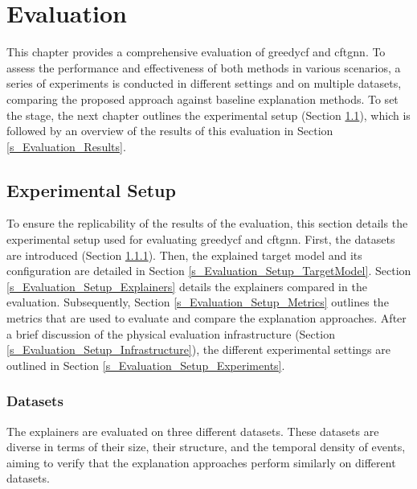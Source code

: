 \section{Evaluation}
\label{s_Evaluation}

This chapter provides a comprehensive evaluation of \gls{greedycf} and \gls{cftgnn}. To assess the performance and effectiveness of both methods in various scenarios, a series of experiments is conducted in different settings and on multiple datasets, comparing the proposed approach against baseline explanation methods. To set the stage, the next chapter outlines the experimental setup (Section \ref{s_Evaluation_Setup}), which is followed by an overview of the results of this evaluation in Section \ref{s_Evaluation_Results}.

\subsection{Experimental Setup}
\label{s_Evaluation_Setup}

To ensure the replicability of the results of the evaluation, this section details the experimental setup used for evaluating \gls{greedycf} and \gls{cftgnn}. First, the datasets are introduced (Section \ref{s_Evaluation_Setup_Datasets}). Then, the explained target model and its configuration are detailed in Section \ref{s_Evaluation_Setup_TargetModel}. Section \ref{s_Evaluation_Setup_Explainers} details the explainers compared in the evaluation. Subsequently, Section \ref{s_Evaluation_Setup_Metrics} outlines the metrics that are used to evaluate and compare the explanation approaches. After a brief discussion of the physical evaluation infrastructure (Section \ref{s_Evaluation_Setup_Infrastructure}), the different experimental settings are outlined in Section \ref{s_Evaluation_Setup_Experiments}.

\subsubsection{Datasets}
\label{s_Evaluation_Setup_Datasets}

The explainers are evaluated on three different datasets. These datasets are diverse in terms of their size, their structure, and the temporal density of events, aiming to verify that the explanation approaches perform similarly on different datasets.

